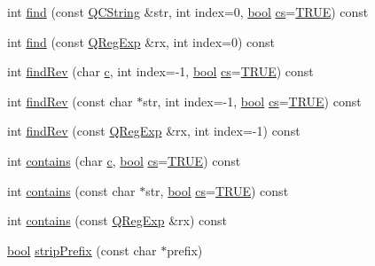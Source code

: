 \begin{DoxyCompactItemize}
int \hyperlink{class_q_c_string_a960d75f3043fa6bc6899e820725464ba}{find} (const \hyperlink{class_q_c_string}{Q\+C\+String} \&str, int index=0, \hyperlink{qglobal_8h_a1062901a7428fdd9c7f180f5e01ea056}{bool} \hyperlink{qtextcodec_8cpp_a067a00d3965ca879847daf3c8c224ee6}{cs}=\hyperlink{qglobal_8h_a04a6422a52070f0dc478693da640242b}{T\+R\+U\+E}) const 
\item 
int \hyperlink{class_q_c_string_aa1c325bf056b2b28afeb7963c088a7c2}{find} (const \hyperlink{class_q_reg_exp}{Q\+Reg\+Exp} \&rx, int index=0) const 
\item 
int \hyperlink{class_q_c_string_ad198335f6face0560cb25a92b704e165}{find\+Rev} (char \hyperlink{060__command__switch_8tcl_ab14f56bc3bd7680490ece4ad7815465f}{c}, int index=-\/1, \hyperlink{qglobal_8h_a1062901a7428fdd9c7f180f5e01ea056}{bool} \hyperlink{qtextcodec_8cpp_a067a00d3965ca879847daf3c8c224ee6}{cs}=\hyperlink{qglobal_8h_a04a6422a52070f0dc478693da640242b}{T\+R\+U\+E}) const 
\item 
int \hyperlink{class_q_c_string_a6a834b91e042cd7fcdac6003af8cd03e}{find\+Rev} (const char $\ast$str, int index=-\/1, \hyperlink{qglobal_8h_a1062901a7428fdd9c7f180f5e01ea056}{bool} \hyperlink{qtextcodec_8cpp_a067a00d3965ca879847daf3c8c224ee6}{cs}=\hyperlink{qglobal_8h_a04a6422a52070f0dc478693da640242b}{T\+R\+U\+E}) const 
\item 
int \hyperlink{class_q_c_string_a3c82b233f58cf133b0adf210ef519573}{find\+Rev} (const \hyperlink{class_q_reg_exp}{Q\+Reg\+Exp} \&rx, int index=-\/1) const 
\item 
int \hyperlink{class_q_c_string_a509acf5548cd0c90f071ddc222b8f27f}{contains} (char \hyperlink{060__command__switch_8tcl_ab14f56bc3bd7680490ece4ad7815465f}{c}, \hyperlink{qglobal_8h_a1062901a7428fdd9c7f180f5e01ea056}{bool} \hyperlink{qtextcodec_8cpp_a067a00d3965ca879847daf3c8c224ee6}{cs}=\hyperlink{qglobal_8h_a04a6422a52070f0dc478693da640242b}{T\+R\+U\+E}) const 
\item 
int \hyperlink{class_q_c_string_a749e830549282bdbb716ec7de945af55}{contains} (const char $\ast$str, \hyperlink{qglobal_8h_a1062901a7428fdd9c7f180f5e01ea056}{bool} \hyperlink{qtextcodec_8cpp_a067a00d3965ca879847daf3c8c224ee6}{cs}=\hyperlink{qglobal_8h_a04a6422a52070f0dc478693da640242b}{T\+R\+U\+E}) const 
\item 
int \hyperlink{class_q_c_string_af282dcfd52e981f564e77ed95dd51eb1}{contains} (const \hyperlink{class_q_reg_exp}{Q\+Reg\+Exp} \&rx) const 
\item 
\hyperlink{qglobal_8h_a1062901a7428fdd9c7f180f5e01ea056}{bool} \hyperlink{class_q_c_string_a3524dfec9219699243b6baf0f33bd0f1}{strip\+Prefix} (const char $\ast$prefix)

\end{DoxyCompactItemize}
